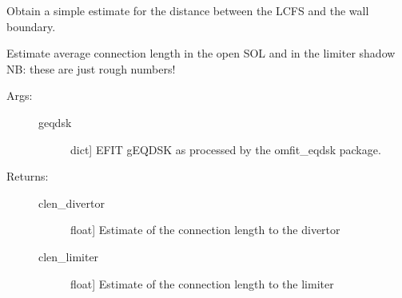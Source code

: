 \documentclass[letterpaper,10pt,english]{sphinxmanual}
\begin{document}

\begin{fulllineitems}
\label{\detokenize{aurora:aurora.grids_utils.estimate_boundary_distance}}
Obtain a simple estimate for the distance between the LCFS and the wall 
boundary.

\end{fulllineitems}


\begin{fulllineitems}
\label{\detokenize{aurora:aurora.grids_utils.estimate_clen}}
Estimate average connection length in the open SOL and in the limiter shadow
NB: these are just rough numbers!
\begin{description}
\item[{Args:}] \leavevmode\begin{description}
\item[{geqdsk}] \leavevmode{[}dict{]}
EFIT g\sphinxhyphen{}EQDSK as processed by the omfit\_eqdsk package.

\end{description}

\item[{Returns:}] \leavevmode\begin{description}
\item[{clen\_divertor}] \leavevmode{[}float{]}
Estimate of the connection length to the divertor

\item[{clen\_limiter}] \leavevmode{[}float{]}
Estimate of the connection length to the limiter

\end{description}

\end{description}

\end{fulllineitems}
\end{document}

